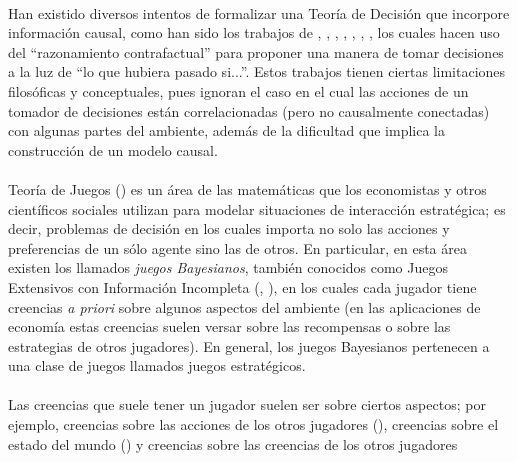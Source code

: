 \documentclass[11pt]{article}
\theoremstyle{plain}
\begin{document}
\\
\indent Han existido diversos intentos de formalizar una Teoría de Decisión que incorpore información causal, como han sido los trabajos de \cite{joyce1999foundations}, \cite{board2006equivalence}, \cite{joyce2012regret}, \cite{ahmed2012push}, \cite{rottman2014reasoning}, \cite{soares2015toward}, \cite{stalnaker2016knowledge}, los cuales hacen uso del “razonamiento contrafactual” para proponer una manera de tomar decisiones a la luz de “lo que hubiera pasado si...”. Estos trabajos tienen ciertas limitaciones filosóficas y conceptuales, pues ignoran el caso en el cual las acciones de un tomador de decisiones están correlacionadas (pero no causalmente conectadas) con algunas partes del ambiente, además de la dificultad que implica la construcción de un modelo causal. \\
\\
\indent Teoría de Juegos (\cite{osborne1994course}) es un área de las matemáticas que los economistas y otros científicos sociales utilizan para modelar situaciones de interacción estratégica; es decir, problemas de decisión en los cuales importa no solo las acciones y preferencias de un sólo agente sino las de otros. En particular, en esta área existen los llamados \textit{juegos Bayesianos}, también conocidos como Juegos Extensivos con Información Incompleta (\cite{osborne1994course}, \cite{10.1007/978-94-010-0189-2_25}),  en los cuales cada jugador tiene creencias \textit{a priori} sobre algunos aspectos del ambiente (en las aplicaciones de economía estas creencias suelen versar sobre las recompensas o sobre las estrategias de otros jugadores). En general, los juegos Bayesianos pertenecen a una clase de juegos llamados juegos estratégicos.\\
\\
Las creencias que suele tener un jugador suelen ser sobre ciertos aspectos; por ejemplo, creencias sobre las acciones de los otros jugadores (\cite{costa2008stated}), creencias sobre el estado del mundo (\cite{dominitz2009empirical}) y creencias sobre las creencias de los otros jugadores
\\
\cite{tingley2010belief}
\end{document}
